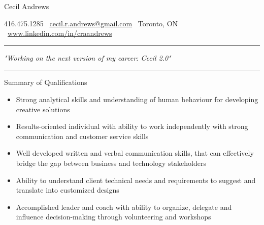 \documentclass{article}
\begin{document}
\begin{center}
   
    \Huge\textcolor{ablue}{Cecil Andrews}

\end{center}

\begin{center}
 
416.475.1285 \textbar  \ \href{mailto:cecil.r.andrews@gmail.com}{cecil.r.andrews@gmail.com}  \textbar  \ Toronto, ON  \textbar  \  \href{http://www.linkedin.com/in/craandrews}{www.linkedin.com/in/craandrews}

\end{center}

\noindent
{\color{ablue} \rule{\linewidth}{0.5mm} }\par
\begin{center}
 \textit{\LARGE"Working on the next version of my career: Cecil 2.0"}\par
\end{center}
\noindent
{\color{ablue} \rule{\linewidth}{0.5mm} }\par


\begin{center}
\large{Summary of Qualifications}
\end{center}


\begin{flushleft}
\begin{itemize}
\item Strong analytical skills and understanding of human behaviour for developing creative solutions\\
\item Results-oriented individual with ability to work independently with strong communication and customer service skills \\
\item Well developed written and verbal communication skills, that can effectively bridge the gap between business and technology stakeholders \\
\item Ability to understand client technical needs and requirements to suggest and translate into customized designs\\
\item Accomplished leader and  coach with ability to organize, delegate and influence decision-making through volunteering and workshops
\end{itemize}
\end{flushleft}
\end{document}
